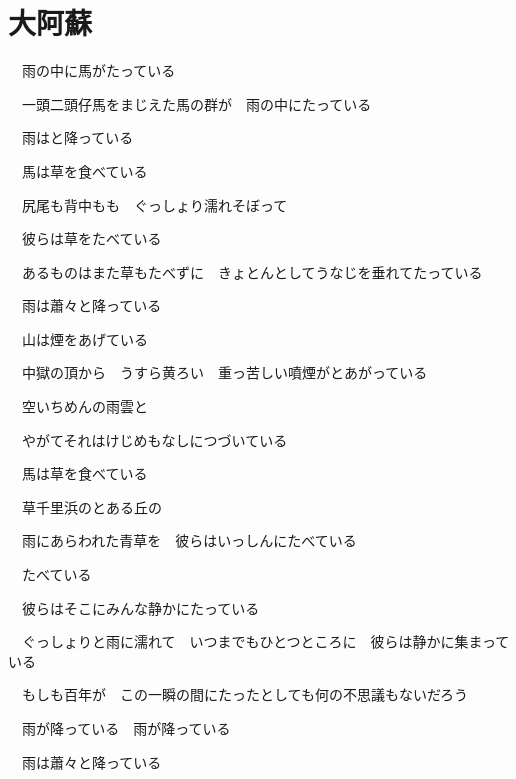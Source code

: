 \section{大阿蘇}



　雨の中に馬がたっている

　一頭二頭仔馬をまじえた馬の群が　雨の中にたっている

　雨はと降っている

　馬は草を食べている

　尻尾も背中もも　ぐっしょり濡れそぼって

　彼らは草をたべている

　あるものはまた草もたべずに　きょとんとしてうなじを垂れてたっている

　雨は蕭々と降っている

　山は煙をあげている

　中獄の頂から　うすら黄ろい　重っ苦しい噴煙がとあがっている

　空いちめんの雨雲と

　やがてそれはけじめもなしにつづいている

　馬は草を食べている

　草千里浜のとある丘の

　雨にあらわれた青草を　彼らはいっしんにたべている

　たべている

　彼らはそこにみんな静かにたっている

　ぐっしょりと雨に濡れて　いつまでもひとつところに　彼らは静かに集まっている

　もしも百年が　この一瞬の間にたったとしても何の不思議もないだろう

　雨が降っている　雨が降っている

　雨は蕭々と降っている